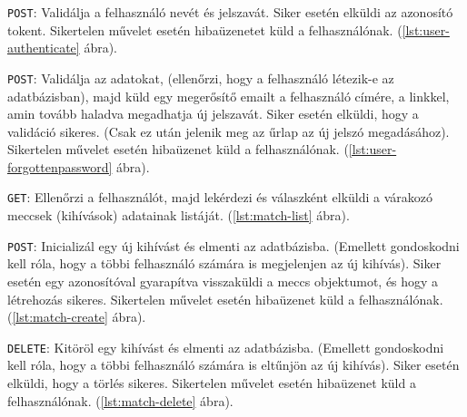 

\texttt{POST}: Validálja a felhasználó nevét és jelszavát.
Siker esetén elküldi az azonosító tokent.
Sikertelen művelet esetén hibaüzenetet küld a felhasználónak. (\ref{lst:user-authenticate} ábra).



\texttt{POST}: Validálja az adatokat, (ellenőrzi, hogy a felhasználó létezik-e az adatbázisban), majd küld egy megerősítő emailt a felhasználó címére, a linkkel, amin tovább haladva megadhatja új jelszavát.
Siker esetén elküldi, hogy a validáció sikeres. (Csak ez után jelenik meg az űrlap az új jelszó megadásához).
Sikertelen művelet esetén hibaüzenet küld a felhasználónak. (\ref{lst:user-forgottenpassword} ábra).




\texttt{GET}: Ellenőrzi a felhasználót, majd lekérdezi és válaszként elküldi a várakozó meccsek (kihívások) adatainak listáját. (\ref{lst:match-list} ábra).



\texttt{POST}: Inicializál egy új kihívást és elmenti az adatbázisba. (Emellett gondoskodni kell róla, hogy a többi felhasználó számára is megjelenjen az új kihívás).
Siker esetén egy azonosítóval gyarapítva visszaküldi a meccs objektumot, és hogy a létrehozás sikeres.
Sikertelen művelet esetén hibaüzenet küld a felhasználónak. (\ref{lst:match-create} ábra).



\texttt{DELETE}: Kitöröl egy kihívást és elmenti az adatbázisba. (Emellett gondoskodni kell róla, hogy a többi felhasználó számára is eltűnjön az új kihívás).
Siker esetén elküldi, hogy a törlés sikeres.
Sikertelen művelet esetén hibaüzenet küld a felhasználónak. (\ref{lst:match-delete} ábra).


